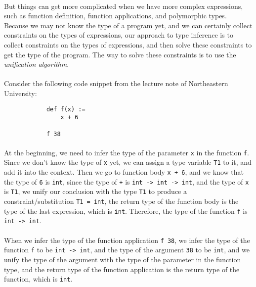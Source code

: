 \documentclass{article}
\begin{document}
    \paragraph{}
        But things can get more complicated when we have more complex expressions, such as function definition, function applications, and polymorphic types.
        Because we may not know the type of a program yet, and we can certainly collect constraints on the types of expressions,
        our approach to type inference is to collect constraints on the types of expressions, and then solve these constraints to get the type of the program.
        The way to solve these constraints is to use the \textit{unification algorithm}.

    \paragraph{}
        Consider the following code snippet from the lecture note of Northeastern University\cite{NEU1}:
        \begin{verbatim}
            def f(x) := 
                x + 6

            f 38
        \end{verbatim}

    \paragraph{}
        At the beginning, we need to infer the type of the parameter \texttt{x} in the function \texttt{f}.
        Since we don't know the type of \texttt{x} yet, we can assign a type variable \texttt{T1} to it, and add it into the context.
        Then we go to function body \texttt{x + 6}, and we know that the type of \texttt{6} is \texttt{int}, since the type of \texttt{+} is \texttt{int -> int -> int},
        and the type of \texttt{x} is \texttt{T1}, we unify our conclusion with the type \texttt{T1} to produce a constraint/substitution \texttt{T1 = int}, the return type of the function body
        is the type of the last expression, which is \texttt{int}. Therefore, the type of the function \texttt{f} is \texttt{int -> int}.

    \paragraph{}
        When we infer the type of the function application \texttt{f 38}, we infer the type of the function \texttt{f} to be \texttt{int -> int}, and
        the type of the argument \texttt{38} to be \texttt{int}, and we unify the type of the argument with the type of the parameter in the function type,
        and the return type of the function application is the return type of the function, which is \texttt{int}.
\end{document}
